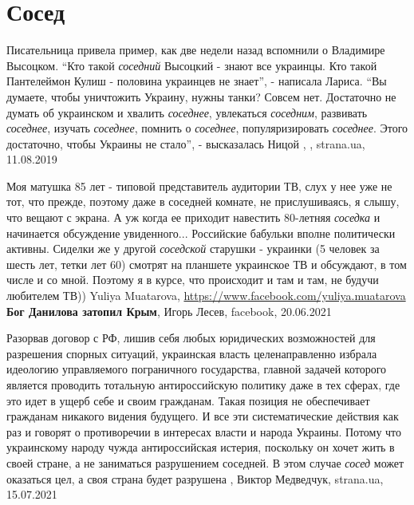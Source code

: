  
 
 
 
 
\chapter{Сосед}
\label{sec:slova.sosed}

Писательница привела пример, как две недели назад вспомнили о Владимире
Высоцком. \enquote{Кто такой \emph{соседний} Высоцкий - знают все украинцы. Кто
такой Пантелеймон Кулиш - половина украинцев не знает}, - написала Лариса.
\enquote{Вы думаете, чтобы уничтожить Украину, нужны танки? Совсем нет.
Достаточно не думать об украинском и хвалить \emph{соседнее}, увлекаться
\emph{соседним}, развивать \emph{соседнее}, изучать \emph{соседнее}, помнить о
\emph{соседнее}, популяризировать \emph{соседнее}.  Этого достаточно, чтобы
Украины не стало}, - высказалась Ницой
, , strana.ua, 11.08.2019

Моя матушка 85 лет - типовой представитель аудитории ТВ, слух
у нее уже не тот, что прежде, поэтому даже в соседней комнате, не
прислушиваясь, я слышу, что вещают с экрана. А уж когда ее приходит навестить
80-летняя \emph{соседка} и начинается обсуждение увиденного... Российские
бабульки вполне политически активны. Сиделки же у другой \emph{соседской}
старушки - украинки (5 человек за шесть лет, тетки лет 60) смотрят на планшете
украинское ТВ и обсуждают, в том числе и со мной. Поэтому я в курсе, что
происходит и там и там, не будучи любителем ТВ))
Yuliya Muatarova, \url{https://www.facebook.com/yuliya.muatarova}
\textbf{Бог Данилова затопил Крым}, Игорь Лесев, facebook, 20.06.2021

Разорвав договор с РФ, лишив себя любых юридических возможностей для разрешения
спорных ситуаций, украинская власть целенаправленно избрала идеологию
управляемого пограничного государства, главной задачей которого является
проводить тотальную антироссийскую политику даже в тех сферах, где это идет в
ущерб себе и своим гражданам. Такая позиция не обеспечивает гражданам никакого
видения будущего.  И все эти систематические действия как раз и говорят о
противоречии в интересах власти и народа Украины. Потому что украинскому народу
чужда антироссийская истерия, поскольку он хочет жить в своей стране, а не
заниматься разрушением соседней. В этом случае \emph{сосед} может оказаться цел, а
своя страна будет разрушена
, 
Виктор Медведчук, strana.ua, 15.07.2021
